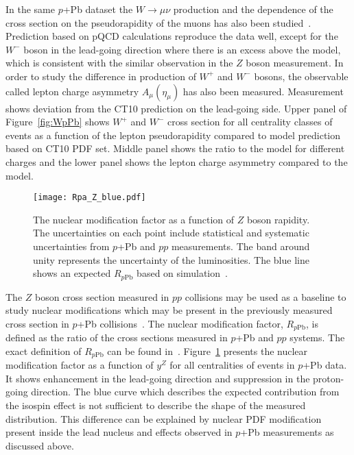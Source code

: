\documentclass[3p,times,twocolumn]{elsarticle}
\newcommand*{\pPb}{\ensuremath{p}+Pb\xspace}
\newcommand*{\Zboson}{\ensuremath{Z}\xspace}
\newcommand*{\Wboson}{\ensuremath{W}\xspace}
\newcommand*{\pp}{\ensuremath{pp}\xspace}
\newcommand{\yZ}{\mbox{$y^{Z}$}\xspace}
\newcommand*{\RpPb}{\ensuremath{R_{p\mathrm{Pb}}}\xspace}
\begin{document}
In the same \pPb dataset the $\Wboson \rightarrow \mu\nu$ production and the dependence of the cross section on the pseudorapidity of the muons has also been studied~\cite{Markus:2015}. Prediction based on pQCD calculations reproduce the data well, except for the $W^{-}$ boson in the lead-going direction where there is an excess above the model, which is consistent with the similar observation in the \Zboson boson measurement. In order to study the difference in production of $W^{+}$ and $W^{-}$ bosons, the observable called lepton charge asymmetry  $A_{\mu}(\eta_{\mu})$ has also been measured. Measurement shows deviation from the CT10 prediction on the lead-going side. Upper panel of Figure~\ref{fig:WpPb} shows $W^{+}$ and $W^{-}$ cross section for all centrality classes of events as a function of the lepton pseudorapidity compared to model prediction based on CT10 PDF set. Middle panel shows the ratio to the model for different charges and the lower panel shows the lepton charge asymmetry compared to the model.  %
\par


\begin{figure}[h!]
\centering
\texttt{[image: Rpa\_Z\_blue.pdf]}
\caption{The nuclear modification factor as a function of \Zboson boson rapidity. The uncertainties on each point include statistical and systematic uncertainties from \pPb and \pp measurements.  The band around unity represents the uncertainty of the luminosities. The blue line shows an expected \RpPb based on simulation~\cite{me:2016}.}
\label{fig:Rpa}
\end{figure}


The \Zboson boson cross section measured in \pp collisions may be used as a baseline to study nuclear modifications which may be present in the previously measured cross section in \pPb collisions~\cite{Aad:2015gta}. 
The nuclear modification factor, \RpPb, is defined as the ratio of the cross sections measured in \pPb and \pp systems. The exact definition of \RpPb can be found in~\cite{me:2016}. Figure~\ref{fig:Rpa} presents the nuclear modification factor as a function of \yZ for all centralities of events in \pPb data. It shows enhancement in the lead-going direction and suppression in the proton-going direction. The blue curve which describes the expected contribution from the isospin effect is not sufficient to describe the shape of the measured distribution. This difference can be explained by nuclear PDF modification present inside the lead nucleus and effects observed in \pPb measurements as discussed above.  \par
\end{document}
